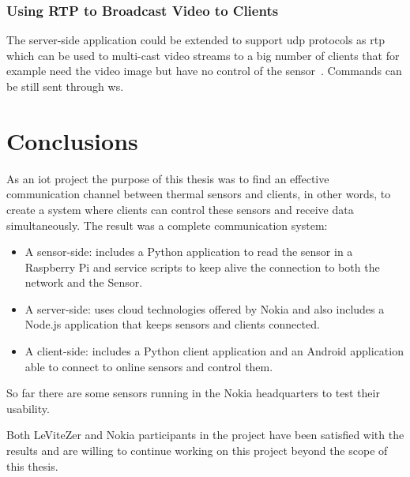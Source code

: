 \documentclass[hidelinks,11pt,a4paper,oneside,article]{memoir}
\begin{document}
\subsection*{Using RTP to Broadcast Video to Clients}
The server-side application could be extended to support \gls{udp} protocols as \gls{rtp} which can be used to multi-cast video streams to a big number of clients that for example need the video image but have no control of the sensor~\cite[298]{hardy2013networks}. Commands can be still sent through \gls{ws}.

\clearpage\chapter{Conclusions}
As an \gls{iot} project the purpose of this thesis was to find an effective communication channel between thermal sensors and clients, in other words, to create a system where clients can control these sensors and receive data simultaneously. The result was a complete communication system:
\begin{itemize}
	\item A sensor-side: includes a Python application to read the sensor in a Raspberry Pi and service scripts to keep alive the connection to both the network and the Sensor.
	\item A server-side: uses cloud technologies offered by Nokia and also includes a Node.js application that keeps sensors and clients connected.
	\item A client-side: includes a Python client application and an Android application able to connect to online sensors and control them.
\end{itemize}
 So far there are some sensors running in the Nokia headquarters to test their usability.
 
 Both LeViteZer and Nokia participants in the project have been satisfied with the results and are willing to continue working on this project beyond the scope of this thesis.
 
\end{document}

